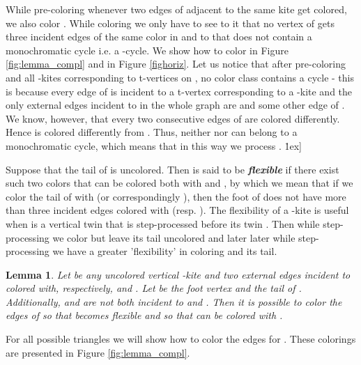 \documentclass[a4, 11pt]{article}
\newcommand{\dowod}{\noindent{\bf Proof.~}}
\newcommand{\koniec}{\hfill \.1ex]}
\newcommand{\<}{\langle}
\renewcommand{\>}{\rangle}
\newtheorem{lemma}{Lemma}
\begin{document}
While pre-coloring  whenever two edges  of  adjacent to the same kite  get colored, we also color .
While coloring  we only have to see to it that no vertex of  gets three incident edges of the same color in  and to that  does not contain a monochromatic cycle i.e. a -cycle. We show how to color  in Figure \ref{fig:lemma_compl} and in Figure \ref{fighoriz}.
 Let us notice that after pre-coloring 
 and all -kites corresponding to t-vertices on , no color class contains a cycle - this is because every edge  of  is incident to a t-vertex corresponding to a -kite  and the only external edges incident to  in the whole graph  are  and some other edge  of . We know, however, that every two consecutive edges of  are colored differently. Hence  is colored differently from . Thus, neither  nor  can belong to a monochromatic cycle, which means that  in this way we process .
\koniec


Suppose that the tail  of  is uncolored. Then  is said to be {\bf \em flexible} if there exist such two colors  that  can be colored both with   and , by which we mean that if we color the tail of  with  (or correspondingly ), then the foot of  does not have more than three incident edges colored with  (resp. ). The flexibility of a -kite  is useful when  is a vertical twin that is step-processed before its twin . Then while step-processing  we color  but leave its tail uncolored and later later while step-processing  we have a greater 'flexibility' in coloring  and its tail.

\begin{lemma}\label{compl}
Let  be any uncolored vertical -kite and  two external edges incident to  colored with, respectively,  and . Let  be the foot vertex  and  the tail of . Additionally,  and  are not both incident to  and  . Then it is possible to color the edges of  so that  becomes flexible and so that  can be colored with . 
\end{lemma}
\dowod For all possible triangles we will show how to color the edges for . These colorings are presented in Figure \ref{fig:lemma_compl}.
\end{document}
